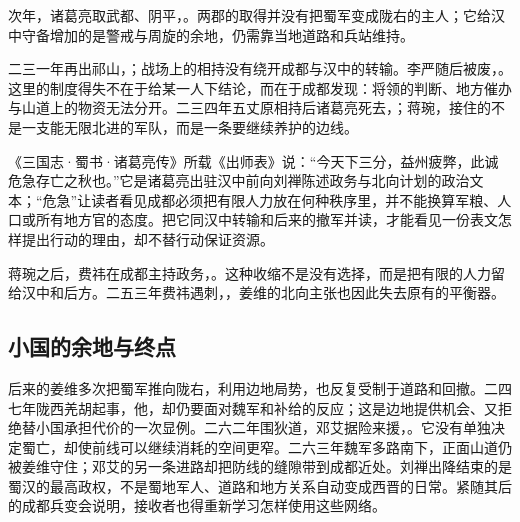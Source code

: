 次年，诸葛亮取武都、阴平，。两郡的取得并没有把蜀军变成陇右的主人；它给汉中守备增加的是警戒与周旋的余地，仍需靠当地道路和兵站维持。

二三一年再出祁山，；战场上的相持没有绕开成都与汉中的转输。李严随后被废，。这里的制度得失不在于给某一人下结论，而在于成都发现：将领的判断、地方催办与山道上的物资无法分开。二三四年五丈原相持后诸葛亮死去，；蒋琬，接住的不是一支能无限北进的军队，而是一条要继续养护的边线。

\begin{textwindow}
《三国志·蜀书·诸葛亮传》所载《出师表》说：“今天下三分，益州疲弊，此诚危急存亡之秋也。”它是诸葛亮出驻汉中前向刘禅陈述政务与北向计划的政治文本；“危急”让读者看见成都必须把有限人力放在何种秩序里，并不能换算军粮、人口或所有地方官的态度。把它同汉中转输和后来的撤军并读，才能看见一份表文怎样提出行动的理由，却不替行动保证资源。
\end{textwindow}

蒋琬之后，费祎在成都主持政务，。这种收缩不是没有选择，而是把有限的人力留给汉中和后方。二五三年费祎遇刺，，姜维的北向主张也因此失去原有的平衡器。

\subsection{小国的余地与终点}

后来的姜维多次把蜀军推向陇右，利用边地局势，也反复受制于道路和回撤。二四七年陇西羌胡起事，他，却仍要面对魏军和补给的反应；这是边地提供机会、又拒绝替小国承担代价的一次显例。二六二年围狄道，邓艾据险来援，。它没有单独决定蜀亡，却使前线可以继续消耗的空间更窄。二六三年魏军多路南下，正面山道仍被姜维守住；邓艾的另一条进路却把防线的缝隙带到成都近处。刘禅出降结束的是蜀汉的最高政权，不是蜀地军人、道路和地方关系自动变成西晋的日常。紧随其后的成都兵变会说明，接收者也得重新学习怎样使用这些网络。

